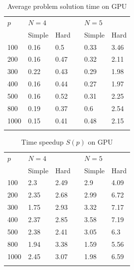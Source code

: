 \documentclass[smallcondensed]{svjour3}     %
\begin{document}
\begin{table}
	\caption{Average problem solution time on GPU}
	\label{tab:last3}
	\center
	\begin{tabular}{llllll}
		\hline\noalign{\smallskip}
		$p$ & \multicolumn{2}{l}{ $N=4$ } & & \multicolumn{2}{l}{$N=5$} \\
		\noalign{\smallskip} \cline{2-3} \cline{5-6} \noalign{\smallskip}
		 & Simple & Hard & & Simple & Hard  \\
		\noalign{\smallskip} \hline \noalign{\smallskip}		
		100  & 0.16 &	0.5 & &	0.33 & 3.46 \\
		200 &	0.16 &	0.47 & &	0.32  &	2.11 \\
		300 &	0.22 &	0.43 & &	0.29  &	1.98 \\
		400 &	0.16 &	0.44 & &	0.27  &	1.97 \\
		500 &	0.16 &	0.52 & &	0.31 &	2.25 \\
		800 &	0.19 &	0.37 & &	0.6 &	2.54 \\
		1000 &	0.15 &	0.41 & &	0.48  &	2.15 \\
		\noalign{\smallskip}\hline
	\end{tabular}
\end{table}


\begin{table}
	\caption{Time speedup $S(p)$ on GPU}
	\label{tab:last2}
	\center
	\begin{tabular}{llllll}
		\hline\noalign{\smallskip}
		$p$ & \multicolumn{2}{l}{ $N=4$ } & & \multicolumn{2}{l}{$N=5$} \\
		\noalign{\smallskip} \cline{2-3} \cline{5-6} \noalign{\smallskip}
		 & Simple & Hard & & Simple & Hard  \\
		\noalign{\smallskip} \hline \noalign{\smallskip}		
		100 &	2.3  &	2.49 & &	2.9  &	4.09 \\
		200 &	2.35 &	2.68 & &	2.99 &	6.72 \\
		300 &	1.75 &	2.93 & &	3.32 &	7.17 \\
		400 &	2.37 &	2.85 & &	3.58 &	7.19 \\
		500 &	2.38 &	2.41 & &	3.05 &	6.3 \\
		800 &	1.94 &	3.38 & &	1.59 &	5.56 \\
		1000 & 2.45 &	3.07 & &	1.98 &	6.59 \\				
		\noalign{\smallskip}\hline
	\end{tabular}
\end{table}
\end{document}
